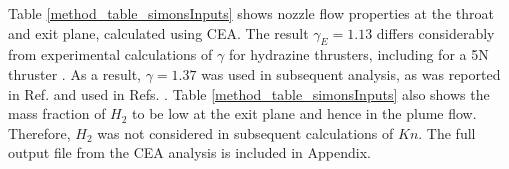 \documentclass[journal]{new-aiaa}
\begin{document}














Table \ref{method_table_simonsInputs} shows nozzle flow properties at the throat and exit plane, calculated using CEA. The result $\gamma_E = 1.13$ differs considerably from experimental calculations of $\gamma$ for hydrazine thrusters, including for a 5N thruster \cite{leggePitotPressureHeattransfer1986}. As a result, $\gamma = 1.37$ was used in subsequent analysis, as was reported in Ref. \cite{leggePitotPressureHeattransfer1986} and used in Refs. \cite{boydModelingSmallHydrazine1990,petersCOBRAContactlessDetumbling2016}. Table \ref{method_table_simonsInputs} also shows the mass fraction of $H_2$ to be low at the exit plane and hence in the plume flow. Therefore, $H_2$ was not considered in subsequent calculations of $Kn$. The full output file from the CEA analysis is included in Appendix. %
\end{document}
